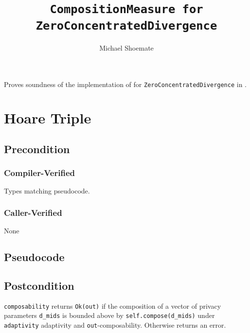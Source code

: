 \documentclass{article}
\title{\texttt{CompositionMeasure for ZeroConcentratedDivergence}}
\author{Michael Shoemate}
\date{}
\begin{document}
\maketitle

\contrib
Proves soundness of the implementation of  
for \texttt{ZeroConcentratedDivergence} in .

\section{Hoare Triple}
\subsection*{Precondition}
\subsubsection*{Compiler-Verified}
Types matching pseudocode.


\subsubsection*{Caller-Verified}
None

\subsection*{Pseudocode}


\subsection*{Postcondition}
\begin{theorem}
  \texttt{composability} returns \texttt{Ok(out)} if the composition of a vector of privacy parameters \texttt{d\_mids} 
  is bounded above by \texttt{self.compose(d\_mids)} under \texttt{adaptivity} adaptivity and \texttt{out}-composability.
  Otherwise returns an error.
\end{theorem}
\end{document}
